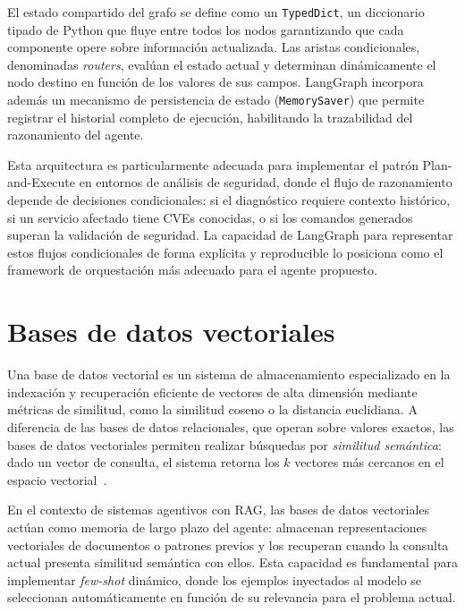 El estado compartido del grafo se define como un
\texttt{TypedDict}, un diccionario tipado de Python que fluye entre
todos los nodos garantizando que cada componente opere sobre
información actualizada. Las aristas condicionales, denominadas
\textit{routers}, evalúan el estado actual y determinan
dinámicamente el nodo destino en función de los valores de sus
campos. LangGraph incorpora además un mecanismo de persistencia de
estado (\texttt{MemorySaver}) que permite registrar el historial
completo de ejecución, habilitando la trazabilidad del razonamiento
del agente.
 
Esta arquitectura es particularmente adecuada para implementar el
patrón Plan-and-Execute en entornos de análisis de seguridad, donde
el flujo de razonamiento depende de decisiones condicionales: si el
diagnóstico requiere contexto histórico, si un servicio afectado
tiene CVEs conocidas, o si los comandos generados superan la
validación de seguridad. La capacidad de LangGraph para representar
estos flujos condicionales de forma explícita y reproducible lo
posiciona como el framework de orquestación más adecuado para el
agente propuesto.


\section{Bases de datos vectoriales}
 
Una base de datos vectorial es un sistema de almacenamiento
especializado en la indexación y recuperación eficiente de
vectores de alta dimensión mediante métricas de similitud, como la
similitud coseno o la distancia euclidiana. A diferencia de las
bases de datos relacionales, que operan sobre valores exactos, las
bases de datos vectoriales permiten realizar búsquedas por
\textit{similitud semántica}: dado un vector de consulta, el
sistema retorna los $k$ vectores más cercanos en el espacio
vectorial~\cite{blefari2026cyberrag}.
 
En el contexto de sistemas agentivos con RAG, las bases de datos
vectoriales actúan como memoria de largo plazo del agente:
almacenan representaciones vectoriales de documentos o patrones
previos y los recuperan cuando la consulta actual presenta
similitud semántica con ellos. Esta capacidad es fundamental para
implementar \textit{few-shot} dinámico, donde los ejemplos
inyectados al modelo se seleccionan automáticamente en función de
su relevancia para el problema actual.
 

